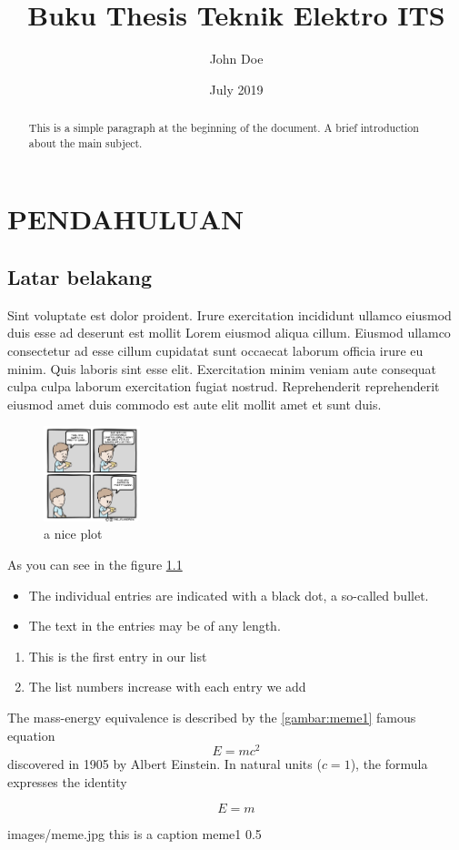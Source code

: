 \documentclass{Thesis-TE-ITS}
\title{Buku Thesis Teknik Elektro ITS}
\author{John Doe}
\date{July 2019}
\begin{document}
\begin{abstract}
This is a simple paragraph at the beginning of the 
document. A brief introduction about the main subject.
\end{abstract}

\chapter{PENDAHULUAN}\label{Bab 1}

\section{Latar belakang}
Sint voluptate est dolor proident. Irure exercitation incididunt ullamco eiusmod duis esse ad deserunt est mollit Lorem eiusmod aliqua cillum. Eiusmod ullamco consectetur ad esse cillum cupidatat sunt occaecat laborum officia irure eu minim. Quis laboris sint esse elit. Exercitation minim veniam aute consequat culpa culpa laborum exercitation fugiat nostrud. Reprehenderit reprehenderit eiusmod amet duis commodo est aute elit mollit amet et sunt duis.

\begin{figure}[h]
    \centering
    \includegraphics[width=0.25\textwidth]{images/meme.jpg}
    \caption{a nice plot}
    \label{fig:mesh1}
\end{figure}

As you can see in the figure \ref{fig:mesh1}

\begin{itemize}
\item The individual entries are indicated with a black dot, a so-called bullet.
\item The text in the entries may be of any length.
\end{itemize}

\begin{enumerate}
\item This is the first entry in our list
\item The list numbers increase with each entry we add
\end{enumerate}

The mass-energy equivalence is described by the \ref{gambar:meme1} famous equation
\[E=mc^2\]
discovered in 1905 by Albert Einstein. 
In natural units ($c = 1$), the formula expresses the identity

\begin{equation}
E=m
\end{equation}

\gambar
    {images/meme.jpg}
    {this is a caption}
    {meme1}
    {0.5}


\end{document}
